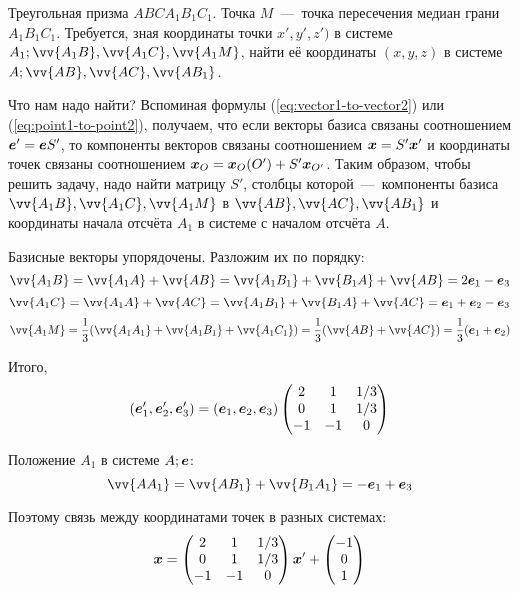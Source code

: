 \documentclass[a4paper,12pt]{article}
\begin{document}
  
  \begin{problem}[4.19]
    Треугольная призма $A B C A_1 B_1 C_1$.
    Точка $M$~---~точка пересечения медиан грани $A_1 B_1 C_1$.
    Требуется, зная координаты точки $x', y', z')$ в системе $A_1; \vv{A_1 B}, \vv{A_1 C}, \vv{A_1 M}$, найти её координаты $(x, y, z)$ в системе $A; \vv{AB}, \vv{AC}, \vv{AB_1}$.
  \end{problem}
  
  \begin{solution}
    
    Что нам надо найти?
    Вспоминая формулы (\ref{eq:vector1-to-vector2}) или (\ref{eq:point1-to-point2}), получаем, что если векторы базиса связаны соотношением $\bds e' \hm= \bds e S'$, то компоненты векторов связаны соотношением $\bds x \hm= S' \bds x'$ и координаты точек связаны соотношением $\bds x_{O} \hm= \bds x_{O}(O') \hm+ S' \bds x_{O'}$.
    Таким образом, чтобы решить задачу, надо найти матрицу $S'$, столбцы которой~---~компоненты базиса $\vv{A_1 B}, \vv{A_1 C}, \vv{A_1 M}$ в $\vv{AB}, \vv{AC}, \vv{AB_1}$ и координаты начала отсчёта $A_1$ в системе с началом отсчёта $A$.
    
    Базисные векторы упорядочены.
    Разложим их по порядку:
    \[
      \vv{A_1 B} = \vv{A_1 A} + \vv{AB} = \vv{A_1 B_1} + \vv{B_1 A} + \vv{AB} = 2 \bds e_1 - \bds e_3  %
    \]
    \[
      \vv{A_1 C} = \vv{A_1 A} + \vv{AC} = \vv{A_1 B_1} + \vv{B_1 A} + \vv{AC} = \bds e_1 + \bds e_2 - \bds e_3
    \]
    \[
      \vv{A_1 M} = \frac{1}{3} (\vv{A_1 A_1} + \vv{A_1 B_1} + \vv{A_1 C_1}) = \frac{1}{3} (\vv{AB} + \vv{AC})
        = \frac{1}{3} (\bds e_1 + \bds e_2)
    \]
    
    Итого,
    \[
      (\boldsymbol e_1', \boldsymbol e_2', \boldsymbol e_3') = (\boldsymbol e_1, \boldsymbol e_2, \boldsymbol e_3) \begin{pmatrix}
        2 & 1 & 1/3\\
        0 & 1 & 1/3\\
        -1 & -1 & 0
      \end{pmatrix}
    \]
    
    Положение $A_1$ в системе $A; \boldsymbol e$:
    \[
      \vv{AA_1} = \vv{AB_1} + \vv{B_1 A_1} = -\bds e_1 + \bds e_3
    \]
    
    Поэтому связь между координатами точек в разных системах:
    \[
      \boldsymbol x = \begin{pmatrix}
        2 & 1 & 1/3\\
        0 & 1 & 1/3\\
        -1 & -1 & 0
      \end{pmatrix} \boldsymbol x'
      + \begin{pmatrix}
        -1\\
        0\\
        1
      \end{pmatrix}
    \]
  \end{solution}
  
\end{document}
